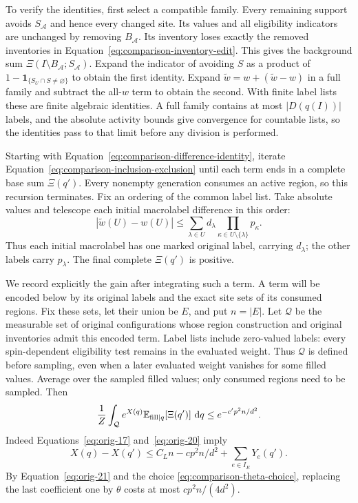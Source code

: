 To verify the identities, first select a compatible family. Every
remaining support avoids $S_{\mathcal A}$ and hence every changed
site. Its values and all eligibility indicators are unchanged by
removing $B_{\mathcal A}$. Its inventory loses exactly the removed
inventories in Equation~\eqref{eq:comparison-inventory-edit}. This
gives the background sum
$\Xi(I\setminus B_{\mathcal A};S_{\mathcal A})$.
Expand the indicator of avoiding $S$ as a product of
$1-\mathbf1_{\{S_U\cap S\ne\varnothing\}}$ to obtain the first
identity. Expand $\widetilde w=w+(\widetilde w-w)$ in a full family
and subtract the all-$w$ term to obtain the second. With finite label
lists these are finite algebraic identities. A full family contains
at most $|D(q(I))|$ labels, and the absolute activity bounds give
convergence for countable lists, so the identities pass to that
limit before any division is performed.

Starting with Equation~\eqref{eq:comparison-difference-identity},
iterate Equation~\eqref{eq:comparison-inclusion-exclusion} until
each term ends in a complete base sum $\Xi(q')$. Every nonempty
generation consumes an active region, so this recursion terminates.
Fix an ordering of the common label list. Take absolute values and
telescope each initial macrolabel difference in this order:
\begin{equation}
 |\widetilde w(U)-w(U)|
 \le\sum_{\lambda\in U}d_\lambda
             \prod_{\kappa\in U\setminus\{\lambda\}}p_\kappa.
 \label{eq:comparison-marked-product}
\end{equation}
Thus each initial macrolabel has one marked original label, carrying
$d_\lambda$; the other labels carry $p_\lambda$. The final complete
$\Xi(q')$ is positive.

We record explicitly the gain after integrating such a term. A term
will be encoded below by its original labels and the exact site sets
of its consumed regions. Fix these sets, let their union be $E$, and
put $n=|E|$. Let $\mathcal Q$ be the measurable set of original
configurations whose region construction and original inventories admit
this encoded term. Label lists include zero-valued labels: every
spin-dependent eligibility test remains in the evaluated weight. Thus
$\mathcal Q$ is defined before sampling, even when a later evaluated
weight vanishes for some filled values. Average over the sampled
filled values; only consumed regions need to be sampled. Then
\begin{equation}
 \frac1Z\int_{\mathcal Q} e^{X(q)}
           \mathbb E_{\mathrm{fill}\mid q}[\Xi(q')]\,\,\mathrm d q
 \le e^{-c'p^2n/d^2}.
 \label{eq:orig-22}
\end{equation}
Indeed Equations~\eqref{eq:orig-17} and~\eqref{eq:orig-20} imply
\[
 X(q)-X(q')\le C_Ln-cp^2n/d^2+\sum_{e\in I_E}Y_e(q').
\]
By Equation~\eqref{eq:orig-21} and the choice
\eqref{eq:comparison-theta-choice}, replacing the last coefficient
one by $\theta$ costs at most $cp^2n/(4d^2)$.

